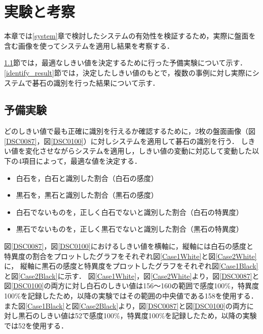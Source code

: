 \documentclass[openright]{nitocs}
\numberwithin{equation}{section}
\begin{document}
    \section{実験と考察} %
        本章では\ref{system}章で検討したシステムの有効性を検証するため，実際に盤面を含む画像を使ってシステムを適用し結果を考察する．

        \ref{threshold}節では，最適なしきい値を決定するために行った予備実験について示す．
        \ref{identify_result}節では，決定したしきい値のもとで，複数の事例に対し実際にシステムで碁石の識別を行った結果について示す．

        \subsection{予備実験} \label{threshold}
            どのしきい値で最も正確に識別を行えるか確認するために，2枚の盤面画像（図\ref{DSC0087}，図\ref{DSC0100}）に対しシステムを適用して碁石の識別を行う．
            しきい値を変化させながらシステムを適用し，しきい値の変動に対応して変動した以下の4項目によって，最適な値を決定する．
            \begin{itemize}
                \item 白石を，白石と識別した割合（白石の感度）
                \item 黒石を，黒石と識別した割合（黒石の感度）
                \item 白石でないものを，正しく白石でないと識別した割合（白石の特異度）
                \item 黒石でないものを，正しく黒石でないと識別した割合（黒石の特異度）
            \end{itemize}

            図\ref{DSC0087}，図\ref{DSC0100}におけるしきい値を横軸に，縦軸には白石の感度と特異度の割合をプロットしたグラフをそれぞれ図\ref{Case1White}と図\ref{Case2White}に，
            縦軸に黒石の感度と特異度をプロットしたグラフをそれぞれ図\ref{Case1Black}と図\ref{Case2Black}に示す．
            図\ref{Case1White}，図\ref{Case2White}より，図\ref{DSC0087}と図\ref{DSC0100}の両方に対し白石のしきい値は156～160の範囲で感度100\%，特異度100\%を記録したため，以降の実験ではその範囲の中央値である158を使用する．
            また図\ref{Case1Black}と図\ref{Case2Black}より，図\ref{DSC0087}と図\ref{DSC0100}の両方に対し黒石のしきい値は52で感度100\%，特異度100\%を記録したため，以降の実験では52を使用する．
\end{document}
